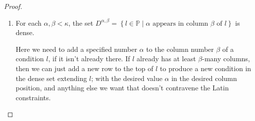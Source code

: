 \documentclass[12pt,a4paper]{article}
\newcommand{\st}{\; | \;}
\newcommand{\set}[2]{\left\{#1\st #2 \right\}}
\renewcommand{\P}{\mathbb{P}}
\begin{document}
\begin{proof}
\begin{enumerate}
$$\begin{array}{cccc}
		\end{array}.$$
		We added 3 to the first row of a new column, and then filled up the column with the minimum values possible while making sure it is Latin. In this case the immunization isn't required, but we'll go ahead and do it to illustrate the process, and ensure it. In this example, there are 4 possible combinations of 3 different columns, since we have 4 columns at this point, so we end up adding 12 new rows to the top of our condition.		
		$$\begin{array}{cccc}
						&\color{blue}17& \color{blue}15&\color{blue}16\\
						&\color{blue}16&\color{blue}17&\color{blue}15\\
						&\color{blue}15&\color{blue}16&\color{blue}17\\
						\color{cyan}14&&\color{cyan}12&\color{cyan}13\\
						\color{cyan}13&&\color{cyan}14&\color{cyan}12\\
						\color{cyan}12&&\color{cyan}13&\color{cyan}14\\
						\color{blue}11&\color{blue}9&&\color{blue}10\\
						\color{blue}10&\color{blue}11&&\color{blue}9\\
						\color{blue}9&\color{blue}10&&\color{blue}11\\
						\color{cyan}8&\color{cyan}6&\color{cyan}7&\\
						\color{cyan}7&\color{cyan}8&\color{cyan}6&\\
						\color{cyan}6&\color{cyan}7&\color{cyan}8&\\
						2  & 0   &  1 &\color{ForestGreen}5\\ 
						1 & 2 &  0 & \color{ForestGreen}4 \\
						0  & 1 & 2 & {\textcolor{red} 3}
		\end{array}$$
Then we can fill in the above with whatever values we would like, so long as the rectangle $l_{-1}''$ we end up with is Latin.
	
	
		\item For each $\alpha, \beta<\kappa$, the set $D^{\alpha, \beta}=\set{l\in \P}{\alpha \text{ appears in column } \beta \text{ of } l}$ is dense. 
		
		Here we need to add a specified number $\alpha$ to the column number $\beta$ of a condition $l$, if it isn't already there. If $l$ already has at least $\beta$-many columns, then we can just add a new row to the top of $l$ to produce a new condition in the dense set extending $l$; with the desired value $\alpha$ in the desired column position, and anything else we want that doesn't contravene the Latin constraints. 
		

\end{enumerate}
\end{proof}
\end{document}
